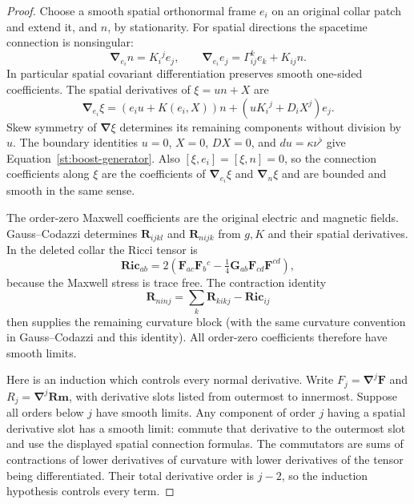 \begin{proof}
Choose a smooth spatial orthonormal frame $e_i$ on an original collar
patch and extend it, and $n$, by stationarity.  For spatial directions
the spacetime connection is nonsingular:
\[
 \boldsymbol\nabla_{e_i}n=K_i{}^j e_j,
 \qquad
 \boldsymbol\nabla_{e_i}e_j=\Gamma_{ij}^k e_k+K_{ij}n.
\]
In particular spatial covariant differentiation preserves smooth
one-sided coefficients.  The spatial derivatives of $\xi=u n+X$ are
\begin{equation}\label{st:derivative-killing}
 \boldsymbol\nabla_{e_i}\xi
 =(e_i u+K(e_i,X))n
   +(uK_i{}^j+D_iX^j)e_j.
\end{equation}
Skew symmetry of $\boldsymbol\nabla\xi$ determines its remaining
components without division by $u$.  The boundary identities
$u=0$, $X=0$, $DX=0$, and $du=\kappa\nu^\flat$ give
Equation~\eqref{st:boost-generator}.  Also
$[\xi,e_i]=[\xi,n]=0$, so the connection coefficients along $\xi$
are the coefficients of $\boldsymbol\nabla_{e_i}\xi$ and
$\boldsymbol\nabla_n\xi$ and are bounded and smooth in the same
sense.

The order-zero Maxwell coefficients are the original electric and
magnetic fields.  Gauss--Codazzi determines
$\mathbf R_{ijkl}$ and $\mathbf R_{nijk}$ from $g,K$ and their
spatial derivatives.  In the deleted collar the Ricci tensor is
\[
 \mathbf{Ric}_{ab}
 =2\left(\mathbf F_{ac}\mathbf F_b{}^c
       -\tfrac14\mathbf G_{ab}\mathbf F_{cd}\mathbf F^{cd}\right),
\]
because the Maxwell stress is trace free.  The contraction identity
\begin{equation}\label{st:ricci-block}
 \mathbf R_{ninj}=\sum_k\mathbf R_{kikj}-\mathbf{Ric}_{ij}
\end{equation}
then supplies the remaining curvature block (with the same curvature
convention in Gauss--Codazzi and this identity).  All order-zero
coefficients therefore have smooth limits.

Here is an induction which controls every normal derivative.  Write
$F_j=\boldsymbol\nabla^j\mathbf F$ and
$R_j=\boldsymbol\nabla^j\mathbf{Rm}$, with derivative slots listed
from outermost to innermost.  Suppose all orders below $j$ have smooth
limits.  Any component of order $j$ having a spatial derivative slot
has a smooth limit: commute that derivative to the outermost slot and
use the displayed spatial connection formulas.  The commutators are
sums of contractions of lower derivatives of curvature with lower
derivatives of the tensor being differentiated.  Their total derivative
order is $j-2$, so the induction hypothesis controls every term.


\end{proof}
